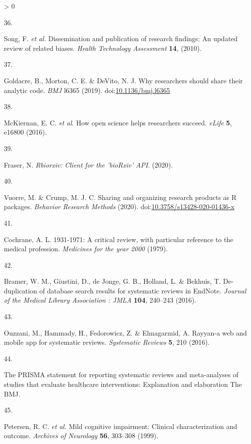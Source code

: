 \documentclass[a4paper, twoside]{templates/ociamthesis}
\newlength{\cslhangindent}
\newlength{\csllabelwidth}
\newenvironment{CSLReferences}[3] %
 {%
  \setlength{\parindent}{0pt}
  \ifodd #1 \everypar{\setlength{\hangindent}{\cslhangindent}}\ignorespaces\fi
  \ifnum #2 > 0
  \setlength{\parskip}{#2\baselineskip}
  \fi
 }%
 {}
\newcommand{\CSLLeftMargin}[1]{\parbox[t]{\maxof{\widthof{#1}}{\csllabelwidth}}{#1}}
\newcommand{\CSLRightInline}[1]{\parbox[t]{\linewidth - \csllabelwidth}{#1}}
\begin{document}
\begin{CSLReferences}{0}{0}
\leavevmode\hypertarget{ref-song2010}{}%
\CSLLeftMargin{36. }
\CSLRightInline{Song, F. \emph{et al.} Dissemination and publication of research findings: An updated review of related biases. \emph{Health Technology Assessment} \textbf{14}, (2010).}

\leavevmode\hypertarget{ref-goldacre2019b}{}%
\CSLLeftMargin{37. }
\CSLRightInline{Goldacre, B., Morton, C. E. \& DeVito, N. J. Why researchers should share their analytic code. \emph{BMJ} l6365 (2019). doi:\href{https://doi.org/10.1136/bmj.l6365}{10.1136/bmj.l6365}}

\leavevmode\hypertarget{ref-mckiernan2016c}{}%
\CSLLeftMargin{38. }
\CSLRightInline{McKiernan, E. C. \emph{et al.} How open science helps researchers succeed. \emph{eLife} \textbf{5}, e16800 (2016).}

\leavevmode\hypertarget{ref-rbiorxiv}{}%
\CSLLeftMargin{39. }
\CSLRightInline{Fraser, N. \emph{Rbiorxiv: {Client} for the '{bioRxiv}' {API}}. (2020).}

\leavevmode\hypertarget{ref-vuorre2020}{}%
\CSLLeftMargin{40. }
\CSLRightInline{Vuorre, M. \& Crump, M. J. C. Sharing and organizing research products as {R} packages. \emph{Behavior Research Methods} (2020). doi:\href{https://doi.org/10.3758/s13428-020-01436-x}{10.3758/s13428-020-01436-x}}

\leavevmode\hypertarget{ref-cochrane20001931}{}%
\CSLLeftMargin{41. }
\CSLRightInline{Cochrane, A. L. 1931-1971: A critical review, with particular reference to the medical profession. \emph{Medicines for the year 2000} (1979).}

\leavevmode\hypertarget{ref-bramer2016}{}%
\CSLLeftMargin{42. }
\CSLRightInline{Bramer, W. M., Giustini, D., de Jonge, G. B., Holland, L. \& Bekhuis, T. De-duplication of database search results for systematic reviews in {EndNote}. \emph{Journal of the Medical Library Association : JMLA} \textbf{104}, 240--243 (2016).}

\leavevmode\hypertarget{ref-ouzzani2016}{}%
\CSLLeftMargin{43. }
\CSLRightInline{Ouzzani, M., Hammady, H., Fedorowicz, Z. \& Elmagarmid, A. Rayyan-a web and mobile app for systematic reviews. \emph{Systematic Reviews} \textbf{5}, 210 (2016).}

\leavevmode\hypertarget{ref-zotero-766}{}%
\CSLLeftMargin{44. }
\CSLRightInline{The {PRISMA} statement for reporting systematic reviews and meta-analyses of studies that evaluate healthcare interventions: Explanation and elaboration \textbar{} {The BMJ}.}

\leavevmode\hypertarget{ref-petersen1999}{}%
\CSLLeftMargin{45. }
\CSLRightInline{Petersen, R. C. \emph{et al.} Mild cognitive impairment: Clinical characterization and outcome. \emph{Archives of Neurology} \textbf{56}, 303--308 (1999).}


\end{CSLReferences}
\end{document}
